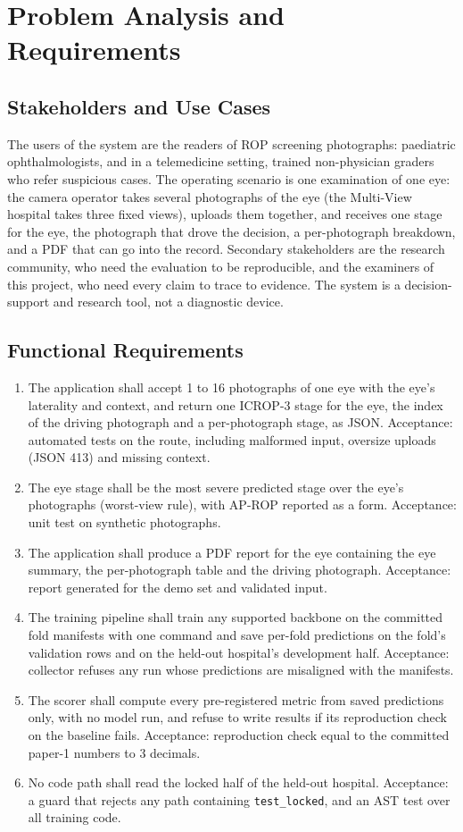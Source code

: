 \chapter{Problem Analysis and Requirements}\label{ch:requirements}
\section{Stakeholders and Use Cases}
The users of the system are the readers of ROP screening photographs: paediatric ophthalmologists, and in a telemedicine setting, trained non-physician graders who refer suspicious cases. The operating scenario is one examination of one eye: the camera operator takes several photographs of the eye (the Multi-View hospital takes three fixed views), uploads them together, and receives one stage for the eye, the photograph that drove the decision, a per-photograph breakdown, and a PDF that can go into the record. Secondary stakeholders are the research community, who need the evaluation to be reproducible, and the examiners of this project, who need every claim to trace to evidence. The system is a decision-support and research tool, not a diagnostic device.

\section{Functional Requirements}
\begin{enumerate}
\item[R1] The application shall accept 1 to 16 photographs of one eye with the eye's laterality and context, and return one ICROP-3 stage for the eye, the index of the driving photograph and a per-photograph stage, as JSON. Acceptance: automated tests on the route, including malformed input, oversize uploads (JSON 413) and missing context.
\item[R2] The eye stage shall be the most severe predicted stage over the eye's photographs (worst-view rule), with AP-ROP reported as a form. Acceptance: unit test on synthetic photographs.
\item[R3] The application shall produce a PDF report for the eye containing the eye summary, the per-photograph table and the driving photograph. Acceptance: report generated for the demo set and validated input.
\item[R4] The training pipeline shall train any supported backbone on the committed fold manifests with one command and save per-fold predictions on the fold's validation rows and on the held-out hospital's development half. Acceptance: collector refuses any run whose predictions are misaligned with the manifests.
\item[R5] The scorer shall compute every pre-registered metric from saved predictions only, with no model run, and refuse to write results if its reproduction check on the baseline fails. Acceptance: reproduction check equal to the committed paper-1 numbers to 3 decimals.
\item[R6] No code path shall read the locked half of the held-out hospital. Acceptance: a guard that rejects any path containing \texttt{test\_locked}, and an AST test over all training code.
\end{enumerate}

